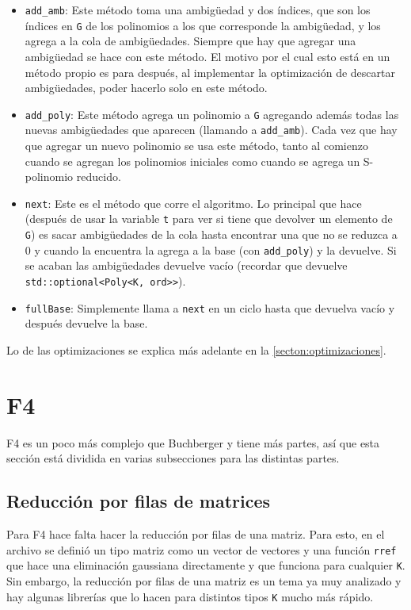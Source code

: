 \documentclass[12pt]{report}
\theoremstyle{customstyle}
\theoremstyle{factstyle}
\begin{document}
\begin{itemize}
  \item \texttt{add\_amb}: Este método toma una ambigüedad y dos índices, que son los índices en \texttt{G} de los polinomios a los que corresponde la ambigüedad, y los agrega a la cola de ambigüedades. Siempre que hay que agregar una ambigüedad se hace con este método. El motivo por el cual esto está en un método propio es para después, al implementar la optimización de descartar ambigüedades, poder hacerlo solo en este método.
  \item \texttt{add\_poly}: Este método agrega un polinomio a \texttt{G} agregando además todas las nuevas ambigüedades que aparecen (llamando a \texttt{add\_amb}). Cada vez que hay que agregar un nuevo polinomio se usa este método, tanto al comienzo cuando se agregan los polinomios iniciales como cuando se agrega un S-polinomio reducido.
  \item \texttt{next}: Este es el método que corre el algoritmo. Lo principal que hace (después de usar la variable \texttt{t} para ver si tiene que devolver un elemento de \texttt{G}) es sacar ambigüedades de la cola hasta encontrar una que no se reduzca a $0$ y cuando la encuentra la agrega a la base (con \texttt{add\_poly}) y la devuelve. Si se acaban las ambigüedades devuelve vacío (recordar que devuelve \texttt{std::optional<Poly<K, ord>>}).
  \item \texttt{fullBase}: Simplemente llama a \texttt{next} en un ciclo hasta que devuelva vacío y después devuelve la base.
\end{itemize}

Lo de las optimizaciones se explica más adelante en la \cref{secton:optimizaciones}.


\section{F4}

F4 es un poco más complejo que Buchberger y tiene más partes, así que esta sección está dividida en varias subsecciones para las distintas partes.

\subsection{Reducción por filas de matrices}

Para F4 hace falta hacer la reducción por filas de una matriz. Para esto, en el archivo  se definió un tipo matriz como un vector de vectores y una función \texttt{rref} que hace una eliminación gaussiana directamente y que funciona para cualquier \texttt{K}. Sin embargo, la reducción por filas de una matriz es un tema ya muy analizado y hay algunas librerías que lo hacen para distintos tipos \texttt{K} mucho más rápido.
\end{document}
